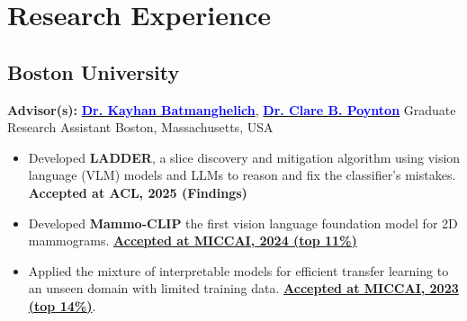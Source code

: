 \section{ Research Experience }
\subsection{Boston University}
      {\textbf{Advisor(s):} {\href{https://www.batman-lab.com/} { \textbf{\textcolor{blue}{Dr. Kayhan Batmanghelich}}}},%
      {\href{https://www.bumc.bu.edu/camed/profile/clare-poynton/}
        { \textbf{\textcolor{blue}{Dr. Clare B. Poynton}}}}}
      {Graduate Research Assistant}%
      {Boston, Massachusetts, USA}%
      {}%
      {
        \begin{itemize}[itemsep=0pt, parsep=0pt]
        \item Developed \textbf{LADDER}, a slice discovery and mitigation algorithm using vision language (VLM) models and LLMs to reason and fix the classifier's mistakes. {\textbf{Accepted at ACL, 2025 (Findings)}}
        \item Developed \textbf{Mammo-CLIP} the first vision language foundation model for 2D mammograms.  \href{https://shantanu-ai.github.io/projects/MICCAI-2024-Mammo-CLIP/}{\textbf{Accepted at MICCAI, 2024 (top 11\%)}}
        \item Applied the mixture of interpretable models for efficient transfer learning to an unseen domain with limited training data.
        \href{https://shantanu-ai.github.io/projects/MICCAI-2023-MoIE-CXR/}{\textbf{Accepted at MICCAI, 2023 (top 14\%)}}.
        \end{itemize}
      }
  
